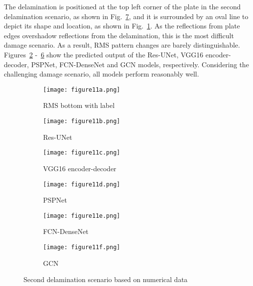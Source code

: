 The delamination is positioned at the top left corner of the plate in the second delamination scenario, as shown in Fig.~\ref{fig:385_softmax}, and it is surrounded by an oval line to depict its shape and location, as shown in Fig.~\ref{fig:RMS_flat_shell_Vz_385}.
As the reflections from plate edges overshadow reflections from the delamination, this is the most difficult damage scenario.
As a result, RMS pattern changes are barely distinguishable.
Figures~\ref{fig:Unet_Pred__softmax_385} -~\ref{fig:gcn_pred_385} show the predicted output of the Res-UNet, VGG16 encoder-decoder, PSPNet, FCN-DenseNet and GCN models, respectively. 
Considering the challenging damage scenario, all models perform reasonably well.
\begin{figure}[!h]
	\centering
	\begin{subfigure}[b]{0.47\textwidth}
		\centering
		\texttt{[image: figure11a.png]}
		\caption{RMS bottom with label}
		\label{fig:RMS_flat_shell_Vz_385}
	\end{subfigure}
	\hfill
	\begin{subfigure}[b]{0.47\textwidth}
		\centering
		\texttt{[image: figure11b.png]}
		\caption{Res-UNet}
		\label{fig:Unet_Pred__softmax_385}
	\end{subfigure}
	\hfill
	\begin{subfigure}[b]{0.47\textwidth}
		\centering
		\texttt{[image: figure11c.png]}
		\caption{VGG16 encoder-decoder}			\label{fig:vgg16_pred__softmax_385}			
	\end{subfigure}
	\hfill
	\begin{subfigure}[b]{0.47\textwidth}
		\centering
		\texttt{[image: figure11d.png]}
		\caption{PSPNet}
		\label{fig:pspnet_pred__softmax_385}
	\end{subfigure}	
	\hfill
	\begin{subfigure}[b]{0.47\textwidth}
		\centering
		\texttt{[image: figure11e.png]}
		\caption{FCN-DenseNet}
		\label{fig:fcn_densenet_pred__softmax_385}
	\end{subfigure}	
	\hfill
	\begin{subfigure}[b]{0.47\textwidth}
		\centering
		\texttt{[image: figure11f.png]}
		\caption{GCN}
		\label{fig:gcn_pred_385}
	\end{subfigure}
	\caption{Second delamination scenario based on numerical data}
	\label{fig:385_softmax}
\end{figure}
\clearpage

